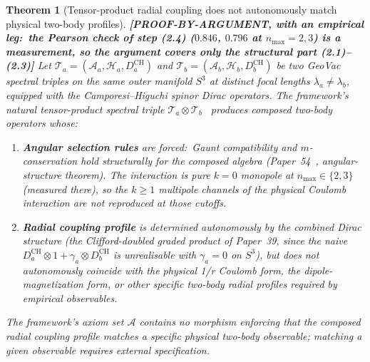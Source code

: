 \documentclass[11pt]{article}
\newtheorem{theorem}{Theorem}
\begin{document}
\begin{theorem}[Tensor-product radial coupling does not autonomously match physical two-body profiles]
\label{thm:spatial_composition_radial_wall}
\textbf{[PROOF-BY-ARGUMENT, with an empirical leg:\ the Pearson check
of step (2.4) ($0.846$, $0.796$ at $n_{\max} = 2, 3$) is a measurement,
so the argument covers only the structural part (2.1)--(2.3)]}
Let $\mathcal{T}_a = (\mathcal{A}_a, \mathcal{H}_a, D_a^{\mathrm{CH}})$ and
$\mathcal{T}_b = (\mathcal{A}_b, \mathcal{H}_b, D_b^{\mathrm{CH}})$ be two
GeoVac spectral triples on the same outer manifold $S^3$ at distinct
focal lengths $\lambda_a \neq \lambda_b$, equipped with the
Camporesi--Higuchi spinor Dirac operators.  The framework's natural
tensor-product spectral triple
$\mathcal{T}_a \otimes \mathcal{T}_b$~\cite{paper39} produces composed
two-body operators whose:
\begin{enumerate}\setlength{\itemsep}{1pt}
\item \textbf{Angular selection rules} are forced:\ Gaunt compatibility
  and $m$-conservation hold structurally for the composed algebra
  (Paper~54~\cite{paper54}, angular-structure theorem).  The interaction is pure $k = 0$ monopole at
  $n_{\max} \in \{2, 3\}$ (measured there), so the $k \ge 1$ multipole
  channels of the physical Coulomb interaction are \emph{not} reproduced
  at those cutoffs.
\item \textbf{Radial coupling profile} is determined autonomously by
  the combined Dirac structure (the Clifford-doubled graded product of
  Paper~39, since the naive $D_a^{\mathrm{CH}} \otimes 1 + \gamma_a
  \otimes D_b^{\mathrm{CH}}$ is unrealisable with $\gamma_a = 0$ on
  $S^3$), but does not autonomously
  coincide with the physical 1/r Coulomb form, the dipole-magnetization
  form, or other specific two-body radial profiles required by
  empirical observables.
\end{enumerate}
The framework's axiom set $\mathcal{A}$ contains no morphism enforcing
that the composed radial coupling profile matches a specific physical
two-body observable; matching a given observable requires external
specification.
\end{theorem}
\end{document}
